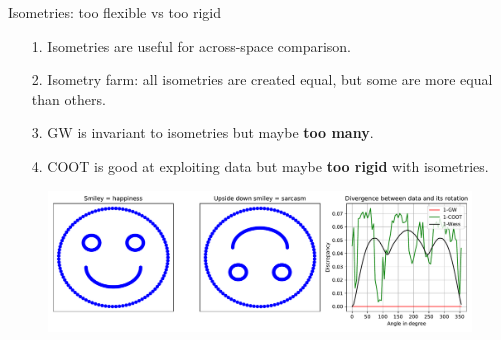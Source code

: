 \documentclass{beamer}
\begin{document}
\begin{frame}{Isometries: too flexible vs too rigid}
\scriptsize

\begin{enumerate}
  \item[1.] Isometries are useful for across-space comparison.
  \item[2.] Isometry farm: all isometries are created equal, but some are more equal than others.
  \item[3.] GW is invariant to isometries but maybe \textbf{too many}.
  \item[4.] COOT is good at exploiting data but maybe \textbf{too rigid} with isometries.
\end{enumerate}
\begin{figure}
    \centering
    \includegraphics[width=1.05\linewidth, keepaspectratio=true]{OT_new/div_vs_angle.pdf}
\end{figure}

\end{frame}
\end{document}
